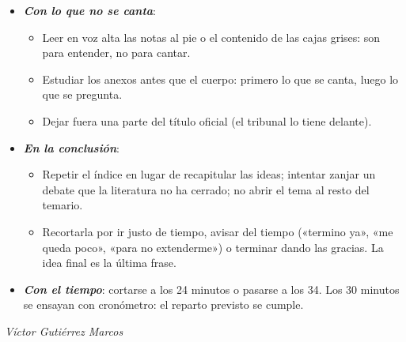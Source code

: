 \documentclass[11pt]{article}
\begin{document}
\begin{itemize}
\begin{itemize}
  \end{itemize}
\item \textbf{\emph{Con lo que no se canta}}:
  \begin{itemize}
  \item Leer en voz alta las notas al pie o el contenido de las cajas grises: son para entender, no para cantar.
  \item Estudiar los anexos antes que el cuerpo: primero lo que se canta, luego lo que se pregunta.
  \item Dejar fuera una parte del título oficial (el tribunal lo tiene delante).
  \end{itemize}
\item \textbf{\emph{En la conclusión}}:
  \begin{itemize}
  \item Repetir el índice en lugar de recapitular las ideas; intentar zanjar un debate que la literatura no ha cerrado; no abrir el tema al resto del temario.
  \item Recortarla por ir justo de tiempo, avisar del tiempo («termino ya», «me queda poco», «para no extenderme») o terminar dando las gracias. La idea final es la última frase.
  \end{itemize}
\item \textbf{\emph{Con el tiempo}}: cortarse a los 24 minutos o pasarse a los 34. Los 30 minutos se ensayan con cronómetro: el reparto previsto se cumple.
\end{itemize}

\vspace{1.5em}
\begin{flushright}
\itshape Víctor Gutiérrez Marcos
\end{flushright}
\end{document}
